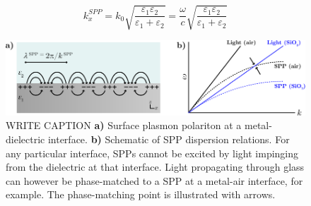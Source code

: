 \begin{equation}\label{eq:Plasmonics:SPPdispersion}
    k^{SPP}_{x} = k_0 \sqrt{\frac{\varepsilon_{1}\varepsilon_{2}}{\varepsilon_{1}+\varepsilon_{2}}} = \frac{\omega}{c} \sqrt{\frac{\varepsilon_{1}\varepsilon_{2}}{\varepsilon_{1}+\varepsilon_{2}}}
\end{equation}

\begin{figure}[htb!]
    \centering
    \includegraphics[scale=1.0]{./figures/background/plasmonics/spp.pdf}
    \caption{\label{fig:background:Plasmonics:SPP} WRITE CAPTION \textbf{a)} Surface plasmon polariton at a metal-dielectric interface. \textbf{b)} Schematic of SPP dispersion relations. For any particular interface, SPPs cannot be excited by light impinging from the dielectric at that interface. Light propagating through glass can however be phase-matched to a SPP at a metal-air interface, for example. The phase-matching point is illustrated with arrows. }
\end{figure}


